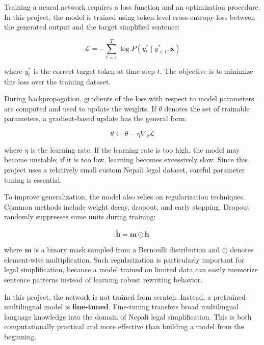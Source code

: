 \documentclass[12pt]{report}
\begin{document}
Training a neural network requires a loss function and an optimization procedure. In this project, the model is trained using token-level cross-entropy loss between the generated output and the target simplified sentence:

\begin{equation}
\mathcal{L} = - \sum_{t=1}^{T} \log P(y_t^{*} \mid y_{<t}^{*}, \mathbf{x})
\end{equation}

where $y_t^{*}$ is the correct target token at time step $t$. The objective is to minimize this loss over the training dataset.

During backpropagation, gradients of the loss with respect to model parameters are computed and used to update the weights. If $\theta$ denotes the set of trainable parameters, a gradient-based update has the general form:

\begin{equation}
\theta \leftarrow \theta - \eta \nabla_{\theta}\mathcal{L}
\end{equation}

where $\eta$ is the learning rate. If the learning rate is too high, the model may become unstable; if it is too low, learning becomes excessively slow. Since this project uses a relatively small custom Nepali legal dataset, careful parameter tuning is essential.

To improve generalization, the model also relies on regularization techniques. Common methods include weight decay, dropout, and early stopping. Dropout randomly suppresses some units during training:

\begin{equation}
\tilde{\mathbf{h}} = \mathbf{m} \odot \mathbf{h}
\end{equation}

where $\mathbf{m}$ is a binary mask sampled from a Bernoulli distribution and $\odot$ denotes element-wise multiplication. Such regularization is particularly important for legal simplification, because a model trained on limited data can easily memorize sentence patterns instead of learning robust rewriting behavior.

In this project, the network is not trained from scratch. Instead, a pretrained multilingual model is \textbf{fine-tuned}. Fine-tuning transfers broad multilingual language knowledge into the domain of Nepali legal simplification. This is both computationally practical and more effective than building a model from the beginning.
\end{document}
